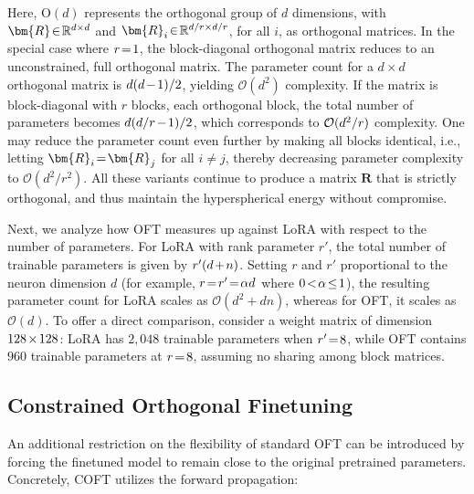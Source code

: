 Here, $\text{O}(d)$ represents the orthogonal group of $d$ dimensions, with $\thickmuskip=2mu \medmuskip=2mu \bm{R}\in\mathbb{R}^{d\times d}$ and $\thickmuskip=2mu \medmuskip=2mu \bm{R}_i\in\mathbb{R}^{d/r\times d/r}$, for all $i$, as orthogonal matrices. In the special case where $\thickmuskip=2mu \medmuskip=2mu r=1$, the block-diagonal orthogonal matrix reduces to an unconstrained, full orthogonal matrix. The parameter count for a $d\times d$ orthogonal matrix is $\thickmuskip=2mu \medmuskip=2mu d(d-1)/2$, yielding $\mathcal{O}(d^2)$ complexity. If the matrix is block-diagonal with $r$ blocks, each orthogonal block, the total number of parameters becomes $\thickmuskip=2mu \medmuskip=2mu d(d/r-1)/2$, which corresponds to $\thickmuskip=2mu \medmuskip=2mu \mathcal{O}(d^2/r)$ complexity. One may reduce the parameter count even further by making all blocks identical, i.e., letting $\thickmuskip=2mu \medmuskip=2mu \bm{R}_i = \bm{R}_j$ for all $i \neq j$, thereby decreasing parameter complexity to $\mathcal{O}(d^2/r^2)$. All these variants continue to produce a matrix $\bm{R}$ that is strictly orthogonal, and thus maintain the hyperspherical energy without compromise.

Next, we analyze how OFT measures up against LoRA with respect to the number of parameters. For LoRA with rank parameter $r'$, the total number of trainable parameters is given by $\thickmuskip=2mu \medmuskip=2mu r'(d+n)$. Setting $r$ and $r'$ proportional to the neuron dimension $d$ (for example, $\thickmuskip=2mu \medmuskip=2mu r = r' = \alpha d$ where $\thickmuskip=2mu \medmuskip=2mu 0 < \alpha \leq 1$), the resulting parameter count for LoRA scales as $\mathcal{O}(d^2 + dn)$, whereas for OFT, it scales as $\mathcal{O}(d)$. To offer a direct comparison, consider a weight matrix of dimension $\thickmuskip=2mu \medmuskip=2mu 128\times128$: LoRA has $2,048$ trainable parameters when $\thickmuskip=2mu \medmuskip=2mu r'=8$, while OFT contains $960$ trainable parameters at $\thickmuskip=2mu \medmuskip=2mu r=8$, assuming no sharing among block matrices.

\subsection{Constrained Orthogonal Finetuning}

An additional restriction on the flexibility of standard OFT can be introduced by forcing the finetuned model to remain close to the original pretrained parameters. Concretely, COFT utilizes the forward propagation:

